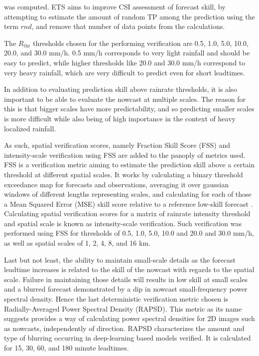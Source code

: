 was computed. ETS aims to improve CSI assessment of forecast skill, by attempting to estimate the amount of random TP among the prediction using the term $rnd$, and remove that number of data points from the calculations.

The $R_{\text{thr}}$ thresholds chosen for the performing verification are 0.5, 1.0, 5.0, 10.0, 20.0, and 30.0 mm/h. 0.5 mm/h corresponds to very light rainfall and should be easy to predict, while higher thresholds like 20.0 and 30.0 mm/h correspond to very heavy rainfall, which are very difficult to predict even for short leadtimes.

In addition to evaluating prediction skill above rainrate thresholds, it is also important to be able to evaluate the nowcast at multiple scales. The reason for this is that bigger scales have more predictability, and so predicting smaller scales is more difficult while also being of high importance in the context of heavy localized rainfall. 


As such, spatial verification scores, namely Fraction Skill Score (FSS) \cite{roberts_scale-selective_2008} and intensity-scale verification using FSS are added to the panoply of metrics used. FSS is a verification metric aiming to estimate the prediction skill above a certain threshold at different spatial scales. It works by calculating a binary threshold exceedance map for forecasts and observations, averaging it over gaussian windows of different lengths representing scales, and calculating for each of those a Mean Squared Error (MSE) skill score relative to a reference low-skill forecast \cite{roberts_scale-selective_2008}. Calculating spatial verification scores for a matrix of rainrate intensity threshold and spatial scale is known as intensity-scale verification. Such verification was performed using FSS for thresholds of 0.5, 1.0, 5.0, 10.0 and 20.0 and 30.0 mm/h, as well as spatial scales of 1, 2, 4, 8, and 16 km. 

Last but not least, the ability to maintain small-scale details as the forecast leadtime increases is related to the skill of the nowcast with regards to the spatial scale. Failure in maintaining those details will results in low skill at small scales and a blurred forecast demonstrated by a dip in nowcast small-frequency power spectral density. Hence the last deterministic verification metric chosen is Radially-Averaged Power Spectral Density (RAPSD). This metric as its name suggests provides a way of calculating power spectral densities for 2D images such as nowcasts, independently of direction. RAPSD characterizes the amount and type of blurring occurring in deep-learning based models verified. It is calculated for 15, 30, 60, and 180 minute leadtimes.
 
